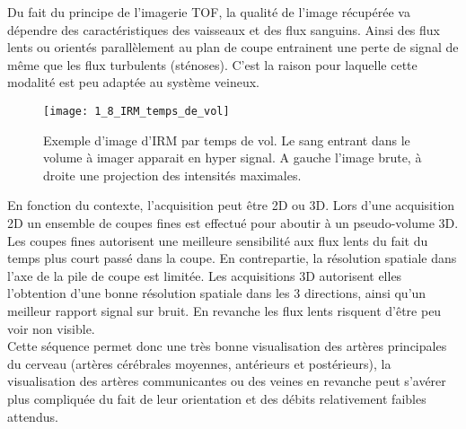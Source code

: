 Du fait du principe de l’imagerie TOF, la qualité de l’image récupérée va dépendre des caractéristiques des vaisseaux et des flux sanguins. Ainsi des flux lents ou orientés parallèlement au plan de coupe entrainent une perte de signal de même que les flux turbulents (sténoses). C’est la raison pour laquelle cette modalité est peu adaptée au système veineux.\\
\begin{figure}[!t]
\centering
\texttt{[image: 1\_8\_IRM\_temps\_de\_vol]}
\caption{Exemple d'image d'IRM par temps de vol. Le sang entrant dans le volume à imager apparait en hyper signal. A gauche l’image brute, à droite une projection des intensités maximales. }
\label{fig:1_8_IRM_temps_de_vol}	
\end{figure}
En fonction du contexte, l’acquisition peut être 2D ou 3D. Lors d’une acquisition 2D un ensemble de coupes fines est effectué pour aboutir à un pseudo-volume 3D. Les coupes fines autorisent une meilleure sensibilité aux flux lents du fait du temps plus court passé dans la coupe. En contrepartie, la résolution spatiale dans l’axe de la pile de coupe est limitée. Les acquisitions 3D autorisent elles l’obtention d’une bonne résolution spatiale dans les 3 directions, ainsi qu’un meilleur rapport signal sur bruit. En revanche les flux lents risquent d’être peu voir non visible.\\
Cette séquence permet donc une très bonne visualisation des artères principales du cerveau (artères cérébrales moyennes, antérieurs et postérieurs), la visualisation des artères communicantes ou des veines en revanche peut s’avérer plus compliquée du fait de leur orientation et des débits relativement faibles attendus.
